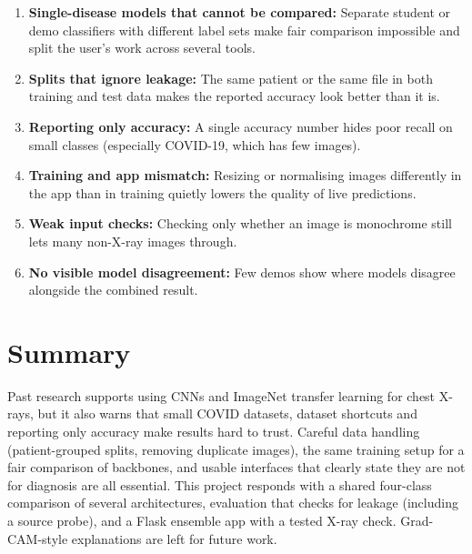 \begin{enumerate}
    \item \textbf{Single-disease models that cannot be compared:} Separate student or demo classifiers with different label sets make fair comparison impossible and split the user's work across several tools.
    \item \textbf{Splits that ignore leakage:} The same patient or the same file in both training and test data makes the reported accuracy look better than it is.
    \item \textbf{Reporting only accuracy:} A single accuracy number hides poor recall on small classes (especially COVID-19, which has few images).
    \item \textbf{Training and app mismatch:} Resizing or normalising images differently in the app than in training quietly lowers the quality of live predictions.
    \item \textbf{Weak input checks:} Checking only whether an image is monochrome still lets many non-X-ray images through.
    \item \textbf{No visible model disagreement:} Few demos show where models disagree alongside the combined result.
\end{enumerate}

\section{Summary}

Past research supports using CNNs and ImageNet transfer learning for chest X-rays, but it also warns that small COVID datasets, dataset shortcuts and reporting only accuracy make results hard to trust. Careful data handling (patient-grouped splits, removing duplicate images), the same training setup for a fair comparison of backbones, and usable interfaces that clearly state they are not for diagnosis are all essential. This project responds with a shared four-class comparison of several architectures, evaluation that checks for leakage (including a source probe), and a Flask ensemble app with a tested X-ray check. Grad-CAM-style explanations are left for future work.

